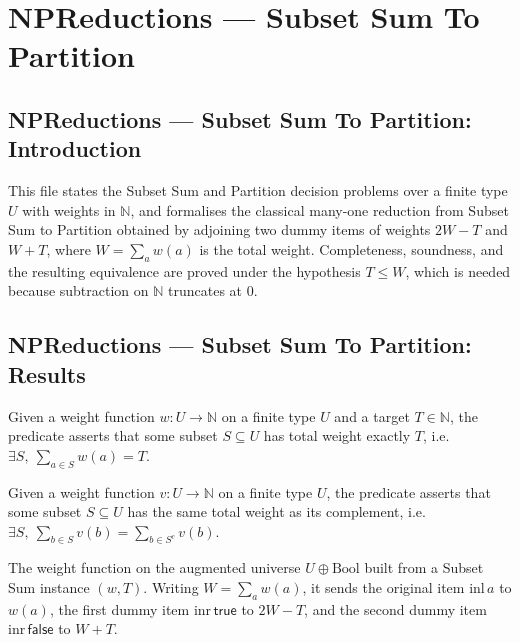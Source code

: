 \section{NPReductions --- Subset Sum To Partition}
\subsection*{NPReductions --- Subset Sum To Partition: Introduction}

This file states the Subset Sum and Partition decision problems over a finite type $U$
with weights in $\mathbb{N}$, and formalises the classical many-one reduction from Subset
Sum to Partition obtained by adjoining two dummy items of weights $2W - T$ and $W + T$,
where $W = \sum_{a} w(a)$ is the total weight. Completeness, soundness, and the resulting
equivalence are proved under the hypothesis $T \le W$, which is needed because
subtraction on $\mathbb{N}$ truncates at $0$.

\subsection*{NPReductions --- Subset Sum To Partition: Results}

\begin{definition}
\label{SubsetSumToPartition.SubsetSum}
\leanok
Given a weight function $w : U \to \mathbb{N}$ on a finite type $U$ and a target
$T \in \mathbb{N}$, the predicate asserts that some subset $S \subseteq U$ has total weight
exactly $T$, i.e.\ $\exists S,\ \sum_{a \in S} w(a) = T$.
\end{definition}

\begin{definition}
\label{SubsetSumToPartition.Partition}
\leanok
Given a weight function $v : U \to \mathbb{N}$ on a finite type $U$, the predicate asserts
that some subset $S \subseteq U$ has the same total weight as its complement, i.e.\
$\exists S,\ \sum_{b \in S} v(b) = \sum_{b \in S^{c}} v(b)$.
\end{definition}

\begin{definition}
\label{SubsetSumToPartition.partitionWeight}
\leanok
The weight function on the augmented universe $U \oplus \mathrm{Bool}$ built from a Subset
Sum instance $(w, T)$. Writing $W = \sum_{a} w(a)$, it sends the original item
$\mathrm{inl}\,a$ to $w(a)$, the first dummy item $\mathrm{inr}\,\mathsf{true}$ to
$2W - T$, and the second dummy item $\mathrm{inr}\,\mathsf{false}$ to $W + T$.
\end{definition}

